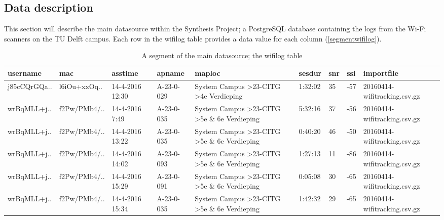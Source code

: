 \subsection{Data description}\label{datadescription}
This section will describe the main datasource within the Synthesis Project; a PostgreSQL database containing the logs from the Wi-Fi scanners on the TU Delft campus. Each row in the wifilog table provides a data value for each column (\autoref{segmentwifilog}).


\begin{table}[H]
	\centering
	\captionsetup{justification=centering}
	\caption{A segment of the main datasource; the wifilog table}
	\label{segmentwifilog}
	\begin{tabular}{@{}lllllllll@{}}
		\toprule
		\textbf{username} & \textbf{mac} & \textbf{asstime} & \textbf{apname}  & \textbf{maploc}                                                     & \textbf{sesdur} & \textbf{snr} & \textbf{ssi} & \textbf{importfile}          \\ \midrule
		j85cCQrGQa..      & l6iOu+xxOq.. & 14-4-2016 12:30  & A-23-0-029 & System Campus \textgreater 23-CITG \textgreater 4e Verdieping       & 1:32:02         & 35           & -57          & 20160414-wifitracking.csv.gz \\
		wrBqMLL+j..       & f2Pw/PMb4/.. & 14-4-2016 7:49   & A-23-0-035 & System Campus \textgreater 23-CITG \textgreater 5e \& 6e Verdieping & 5:32:16         & 37           & -56          & 20160414-wifitracking.csv.gz \\
		wrBqMLL+j..       & f2Pw/PMb4/.. & 14-4-2016 13:22  & A-23-0-035 & System Campus \textgreater 23-CITG \textgreater 5e \& 6e Verdieping & 0:40:20         & 46           & -50          & 20160414-wifitracking.csv.gz \\
		wrBqMLL+j..       & f2Pw/PMb4/.. & 14-4-2016 14:02  & A-23-0-093 & System Campus \textgreater 23-CITG \textgreater 5e \& 6e Verdieping & 1:27:13         & 11           & -86          & 20160414-wifitracking.csv.gz \\
		wrBqMLL+j..       & f2Pw/PMb4/.. & 14-4-2016 15:29  & A-23-0-091 & System Campus \textgreater 23-CITG \textgreater 5e \& 6e Verdieping & 0:05:08         & 30           & -65          & 20160414-wifitracking.csv.gz \\
		wrBqMLL+j..       & f2Pw/PMb4/.. & 14-4-2016 15:34  & A-23-0-035 & System Campus \textgreater 23-CITG \textgreater 5e \& 6e Verdieping & 1:42:32         & 29           & -65          & 20160414-wifitracking.csv.gz \\

\end{tabular}
\end{table}

